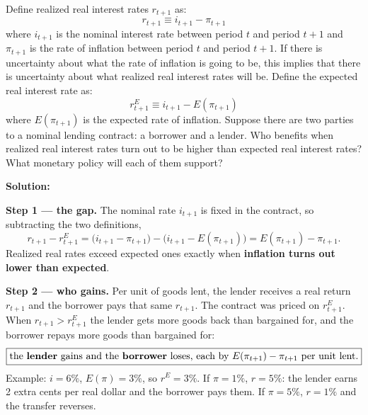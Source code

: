 \documentclass[12pt, letterpaper]{article}
\begin{document}
\begin{tcolorbox}[evenbox,title={Problem 11.8 \quad Real Interest Rates}]
\begin{tcolorbox}[questionbox]
Define realized real interest rates $r_{t+1}$ as:
\[
r_{t+1}\equiv i_{t+1}-\pi_{t+1}
\]
where $i_{t+1}$ is the nominal interest rate between period $t$ and period $t+1$ and $\pi_{t+1}$ is
the rate of inflation between period $t$ and period $t+1$. If there is uncertainty about what the
rate of inflation is going to be, this implies that there is uncertainty about what realized real
interest rates will be. Define the expected real interest rate as:
\[
r^E_{t+1}\equiv i_{t+1}-E(\pi_{t+1})
\]
where $E(\pi_{t+1})$ is the expected rate of inflation. Suppose there are two parties to a nominal
lending contract: a borrower and a lender. Who benefits when realized real interest rates turn out
to be higher than expected real interest rates? What monetary policy will each of them support?
\end{tcolorbox}

\textbf{Solution:}

\textbf{Step 1 --- the gap.} The nominal rate $i_{t+1}$ is fixed in the contract, so subtracting
the two definitions,
\[
r_{t+1}-r^E_{t+1}=\bigl(i_{t+1}-\pi_{t+1}\bigr)-\bigl(i_{t+1}-E(\pi_{t+1})\bigr)=E(\pi_{t+1})-\pi_{t+1}.
\]
Realized real rates exceed expected ones exactly when \textbf{inflation turns out lower than
expected}.

\textbf{Step 2 --- who gains.} Per unit of goods lent, the lender receives a real return
$r_{t+1}$ and the borrower pays that same $r_{t+1}$. The contract was priced on $r^E_{t+1}$. When
$r_{t+1}>r^E_{t+1}$ the lender gets more goods back than bargained for, and the borrower repays
more goods than bargained for:
\[
\boxed{\text{the \textbf{lender} gains and the \textbf{borrower} loses, each by }E(\pi_{t+1})-\pi_{t+1}
\text{ per unit lent.}}
\]
Example: $i=6\%$, $E(\pi)=3\%$, so $r^E=3\%$. If $\pi=1\%$, $r=5\%$: the lender earns 2
extra cents per real dollar and the borrower pays them. If $\pi=5\%$, $r=1\%$ and the transfer
reverses.


\end{tcolorbox}
\end{document}
